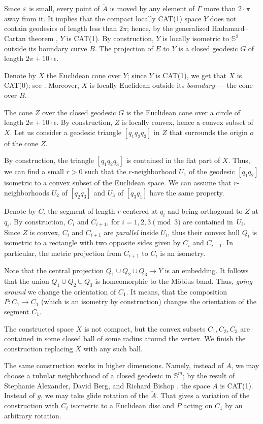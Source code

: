 \documentclass[a4paper,10pt]{article}
\begin{document}
Since $\varepsilon$ is small, every point of $\tilde A$ is moved by any element of $\Gamma$ more than $2\cdot\pi$ away from it.
It implies that the compact locally CAT(1) space $Y$ does not  contain geodesics of length less than $2\pi$;
hence, by  the generalized Hadamard--Cartan theorem \cite{AKP}, $Y$ is CAT(1).
By construction, $Y$ is locally isometric to $\mathbb{S}^2$ outside its boundary curve $B$.
The projection of $E$ to $Y$ is a closed geodesic $G$ of length $2\pi +10\cdot\epsilon$.

Denote by $X$ the Euclidean cone over $Y$;
since $Y$ is CAT(1), we get that $X$ is CAT(0); see \cite{AKP}.
Moreover, $X$ is locally Euclidean outside its \emph{boundary} --- the cone over $B$.

The cone $Z$ over the closed geodesic $G$ is  the Euclidean cone over a circle of length $2\pi +10\cdot\epsilon$. By construction,
$Z$ is locally convex, hence a convex subset of~$X$.
Let us consider a geodesic triangle
$[q_1q_2q_3]$
in $Z$ that surrounds the origin $o$ of the cone $Z$.

By construction, the triangle $[q_1q_2q_3]$ is contained in the flat part of $X$.
Thus, we can find a small $r>0$ such that the $r$-neighborhood $U_1$ of the geodesic $[q_1q_2]$ isometric to a convex subset of the Euclidean space.
We can assume that $r$-neighborhoods $U_2$ of $[q_2q_3]$ and $U_3$ of $[q_3q_1]$ have the same property.

Denote by $C_i$ the segment of length $r$ centered at $q_i$ and being orthogonal to $Z$ at $q_i$.
By construction, $C_i$ and $C_{i+1}$, for $i=1,2,3\pmod 3$   are contained in~$U_i$.
Since $Z$ is convex, $C_i$ and $C_{i+1}$ are \emph{parallel} inside $U_i$, thus their convex hull  $Q_i$ is isometric to a rectangle with two opposite sides given by $C_i$ and $C_{i+1}$.
In particular, the metric projection from $C_{i+1}$ to $C_{i}$ is an isometry.

Note that the central projection $Q_1\cup Q_2\cup Q_3\to Y$ is an embedding.
It follows that the union $Q_1\cup Q_2\cup Q_3$ is homeomorphic to the Möbius band.
Thus, \emph{going around} we change the orientation of $C_1$.
It means, that the composition $P:C_1\to C_1$ (which is an isometry by construction) changes the orientation of the 
segment $C_1$.

The constructed space $X$ is not compact, but  the convex subsets $C_1,C_2,C_3$ are contained in some closed  ball of some radius around the vertex.  We finish the construction replacing $X$ with any such ball.	
\qeds

The same construction works in higher dimensions.
Namely, instead of $A$, we may choose a tubular neighborhood of a closed geodesic in $\mathbb{S}^m$;
by the result of Stephanie Alexander,  David Berg, and Richard Bishop \cite{ABB-1993}, the space $A$ is CAT(1).
Instead of $g$, we may take glide rotation of the $\tilde A$.
That gives a variation of the construction with $C_i$ isometric to a Euclidean disc and $P$ acting on $C_1$ by an arbitrary rotation.

{\sloppy
\printbibliography[heading=bibintoc]
\fussy
}
\end{document}
